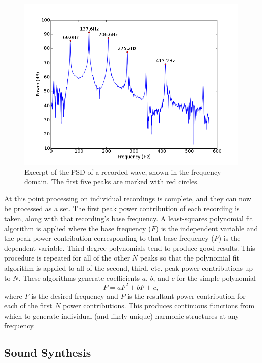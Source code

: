 \documentclass[twocolumn]{article}
\begin{document}
\begin{figure}
\centering
\includegraphics[width=\linewidth]{figures/recording-peaks.png}
\caption{Excerpt of the PSD of a recorded wave, shown in the frequency domain. The first five peaks are marked with red circles.}
\label{peaks}
\end{figure}

At this point processing on individual recordings is complete, and they can now be processed as a set. The first peak power contribution of each recording is taken, along with that recording's base frequency. A least-squares polynomial fit algorithm is applied where the base frequency ($F$) is the independent variable and the peak power contribution corresponding to that base frequency ($P$) is the dependent variable. Third-degree polynomials tend to produce good results. This procedure is repeated for all of the other $N$ peaks so that the polynomial fit algorithm is applied to all of the second, third, etc. peak power contributions up to $N$. These algorithms generate coefficients $a$, $b$, and $c$ for the simple polynomial \begin{equation} \label{eq:power} P = aF^2 + bF + c,\end{equation} where $F$ is the desired frequency and $P$ is the resultant power contribution for each of the first $N$ power contributions. This produces continuous functions from which to generate individual (and likely unique) harmonic structures at any frequency.

\subsection{Sound Synthesis}
\end{document}
